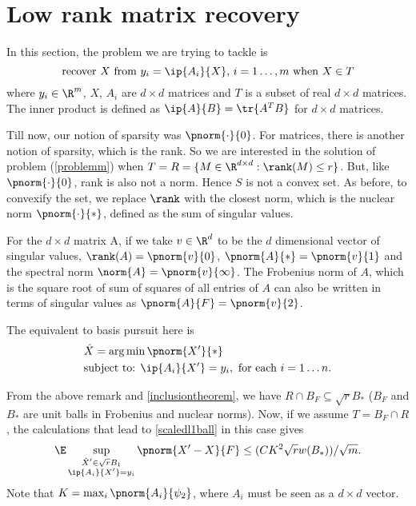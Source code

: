 \section{Low rank matrix recovery}
	In this section, the problem we are trying to tackle is
\begin{equation}\label{problemm}
	\text{recover }X\text{ from }y_i = \ip{A_i}{X},
	\,i=1\ldots, m \text{ when }X \in T
\end{equation}
where $y_i\in\R^m$, $X$, $A_i$ are $d\times d$ matrices
and $T$ is a subset of real $d\times d$ matrices.
The inner product is defined as  $\ip{A}{B}= \tr{A^T B}$
for $d\times d$ matrices.

	Till now, our notion of sparsity was $\pnorm{\cdot}{0}$.
For matrices, there is another notion of sparsity,
which is the rank.
So we are interested in the solution of problem (\ref{problemm})
when $T = R = \{M\in \R^{d\times d}: \rank(M)\leq r\}$.
But, like $\pnorm{\cdot}{0}$, rank is
also not a norm. Hence $S$ is not a convex set.
As before, to convexify the set, we replace $\rank$ with the
closest norm, which is the nuclear norm $\pnorm{\cdot}{*}$,
defined as the sum of singular values.

\begin{remark}\label{matrixnormsremark}
	For the $d\times d$ matrix A, if we take $v\in\R^d$ to
	be the $d$ dimensional vector of singular values,
	$\rank(A) = \pnorm{v}{0}$, $\pnorm{A}{*} = \pnorm{v}{1}$
	and the spectral norm $\norm{A} = \pnorm{v}{\infty}$.
	The Frobenius norm of $A$, which is the square root of
	sum of squares of all entries of $A$ can also be written
	in terms of singular values as $\pnorm{A}{F} = \pnorm{v}{2}$.
\end{remark}

The equivalent to basis pursuit here is
\begin{equation}\label{mbasispursuit}
	\begin{split}
		&\hat{X} = \arg\min\pnorm{X'}{*}\\
		&\text{subject to: } \ip{A_i}{X'} = y_i,\text{ for each }
		i = 1\ldots n.
	\end{split}
\end{equation}

From the above remark and \eqref{inclusiontheorem},
we have $R\cap B_F \subseteq \sqrt{r}B_*$ ($B_F$ and $B_*$ are
unit balls in Frobenius and nuclear norms).
Now, if we assume $T =  B_F\cap R$, the calculations that
lead to \eqref{scaledl1ball} in this case gives
\begin{equation}\label{errorm}
	\E\sup_{\substack{\hat{X}'\in \sqrt{r}B_1\\ \ip{A_i}{X'} = y_i}}
	\pnorm{X'-X}{F}\leq ({CK^2\sqrt{r} w(B_*)})/{\sqrt{m}}.
\end{equation}
Note that $K = \max_i \pnorm{A_i}{\psi_2}$, where $A_i$
must be seen as a $d\times d$ vector.

